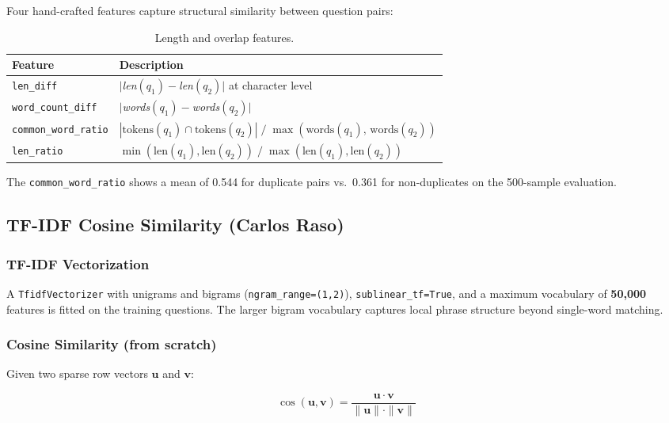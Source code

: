 \documentclass[11pt,a4paper]{article}
\begin{document}
Four hand-crafted features capture structural similarity between question pairs:

\begin{table}[h]
\centering
\caption{Length and overlap features.}
\begin{tabularx}{\textwidth}{lX}
\toprule
\textbf{Feature} & \textbf{Description} \\
\midrule
\texttt{len\_diff}           & $|$\textit{len}$(q_1) - $\textit{len}$(q_2)|$ at character level \\
\texttt{word\_count\_diff}   & $|$\textit{words}$(q_1) - $\textit{words}$(q_2)|$ \\
\texttt{common\_word\_ratio} & $|\text{tokens}(q_1) \cap \text{tokens}(q_2)| \;/\; \max(\text{words}(q_1),\,\text{words}(q_2))$ \\
\texttt{len\_ratio}          & $\min(\text{len}(q_1),\text{len}(q_2)) \;/\; \max(\text{len}(q_1),\text{len}(q_2))$ \\
\bottomrule
\end{tabularx}
\end{table}

The \texttt{common\_word\_ratio} shows a mean of 0.544 for duplicate pairs vs.\ 0.361 for non-duplicates on the 500-sample evaluation.

\subsection{TF-IDF Cosine Similarity \textnormal{(Carlos Raso)}}

\subsubsection{TF-IDF Vectorization}

A \texttt{TfidfVectorizer} with unigrams and bigrams (\texttt{ngram\_range=(1,2)}), \texttt{sublinear\_tf=True}, and a maximum vocabulary of \textbf{50{,}000} features is fitted on the training questions. The larger bigram vocabulary captures local phrase structure beyond single-word matching.

\subsubsection{Cosine Similarity (from scratch)}

Given two sparse row vectors $\mathbf{u}$ and $\mathbf{v}$:

\[
    \cos(\mathbf{u}, \mathbf{v}) = \frac{\mathbf{u} \cdot \mathbf{v}}{\|\mathbf{u}\| \cdot \|\mathbf{v}\|}
\]
\end{document}
